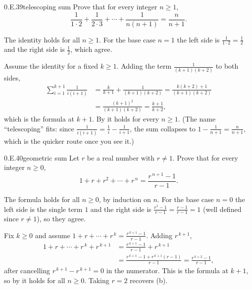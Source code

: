\documentclass[main.tex]{subfiles}
\begin{document}
\begin{Exercise}{0.E.39}{telescoping sum}
Prove that for every integer $n\ge 1$,
\[
\frac{1}{1\cdot 2}+\frac{1}{2\cdot 3}+\cdots+\frac{1}{n(n+1)}=\frac{n}{n+1}.
\]
\end{Exercise}
\begin{Solution}
The identity holds for all $n\ge 1$. For the base case $n=1$ the left side is $\tfrac{1}{1\cdot 2}
=\tfrac12$ and the right side is $\tfrac{1}{2}$, which agree.

Assume the identity for a fixed $k\ge 1$. Adding the term $\tfrac{1}{(k+1)(k+2)}$ to both sides,
\[
\begin{aligned}
\sum_{i=1}^{k+1}\frac{1}{i(i+1)}
&=\frac{k}{k+1}+\frac{1}{(k+1)(k+2)}
=\frac{k(k+2)+1}{(k+1)(k+2)}\\[2pt]
&=\frac{(k+1)^2}{(k+1)(k+2)}=\frac{k+1}{k+2},
\end{aligned}
\]
which is the formula at $k+1$. By  it holds for every $n\ge 1$. (The name ``telescoping''
fits: since $\tfrac{1}{i(i+1)}=\tfrac1i-\tfrac1{i+1}$, the sum collapses to $1-\tfrac{1}{n+1}
=\tfrac{n}{n+1}$, which is the quicker route once you see it.)
\end{Solution}

\begin{Exercise}{0.E.40}{geometric sum}
Let $r$ be a real number with $r\ne 1$. Prove that for every integer $n\ge 0$,
\[
1+r+r^2+\cdots+r^{\,n}=\frac{r^{\,n+1}-1}{r-1}.
\]
\end{Exercise}
\begin{Solution}
The formula holds for all $n\ge 0$, by induction on $n$. For the base case $n=0$ the left side is the
single term $1$ and the right side is $\tfrac{r^{1}-1}{r-1}=\tfrac{r-1}{r-1}=1$ (well defined since
$r\ne 1$), so they agree.

Fix $k\ge 0$ and assume $1+r+\cdots+r^{\,k}=\tfrac{r^{\,k+1}-1}{r-1}$. Adding $r^{\,k+1}$,
\[
\begin{aligned}
1+r+\cdots+r^{\,k}+r^{\,k+1}
&=\frac{r^{\,k+1}-1}{r-1}+r^{\,k+1}\\[2pt]
&=\frac{r^{\,k+1}-1+r^{\,k+1}(r-1)}{r-1}=\frac{r^{\,k+2}-1}{r-1},
\end{aligned}
\]
after cancelling $r^{\,k+1}-r^{\,k+1}=0$ in the numerator. This is the formula at $k+1$, so by
 it holds for all $n\ge 0$. Taking $r=2$ recovers (b).
\end{Solution}
\end{document}
